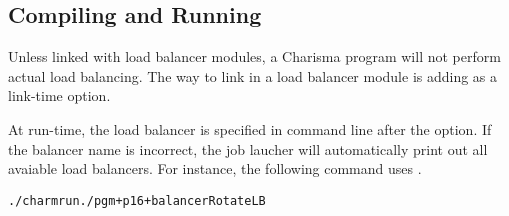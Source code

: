 \subsection{Compiling and Running}
Unless linked with load balancer modules, a Charisma program will not perform
actual load balancing. The way to link in a load balancer module is adding
 as a link-time option. 

At run-time, the load balancer is specified in command line after the
 option. If the balancer name is incorrect, the job laucher will
automatically print out all avaiable load balancers. For instance, the following
command uses . 

\begin{alltt}
    ./charmrun ./pgm +p16 +balancer RotateLB
\end{alltt}




